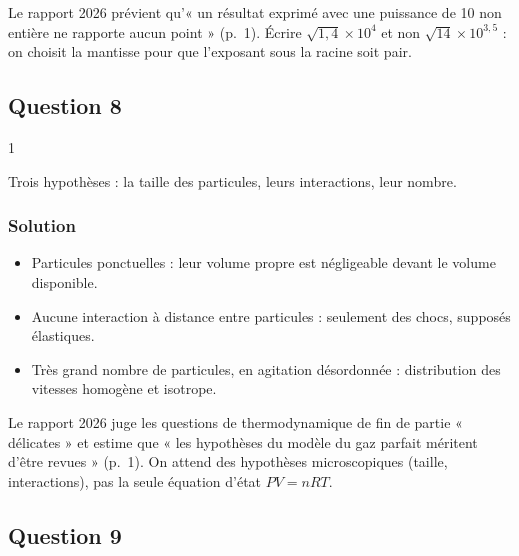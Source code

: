 \documentclass[11pt,a4paper]{article}
\providecommand{\tightlist}{\setlength{\itemsep}{0pt}\setlength{\parskip}{0pt}}
\begin{document}
\begin{piege}

Le rapport 2026 prévient qu'« un résultat exprimé avec une puissance de 10 non entière ne rapporte aucun point » (p.~1). Écrire \(\sqrt{1{,}4}\times10^{4}\) et non \(\sqrt{14}\times10^{3{,}5}\) : on choisit la mantisse pour que l'exposant sous la racine soit pair.

\end{piege}

\hypertarget{question-8}{%
\subsection{Question 8}\label{question-8}}

\begin{indication}{1}

Trois hypothèses : la taille des particules, leurs interactions, leur nombre.

\end{indication}

\hypertarget{solution-7}{%
\subsubsection{Solution}\label{solution-7}}

\begin{itemize}
\tightlist
\item
  Particules ponctuelles : leur volume propre est négligeable devant le volume disponible.
\item
  Aucune interaction à distance entre particules : seulement des chocs, supposés élastiques.
\item
  Très grand nombre de particules, en agitation désordonnée : distribution des vitesses homogène et isotrope.
\end{itemize}

\begin{jury}

Le rapport 2026 juge les questions de thermodynamique de fin de partie « délicates » et estime que « les hypothèses du modèle du gaz parfait méritent d'être revues » (p.~1). On attend des hypothèses microscopiques (taille, interactions), pas la seule équation d'état \(PV=nRT\).

\end{jury}

\hypertarget{question-9}{%
\subsection{Question 9}\label{question-9}}
\end{document}
